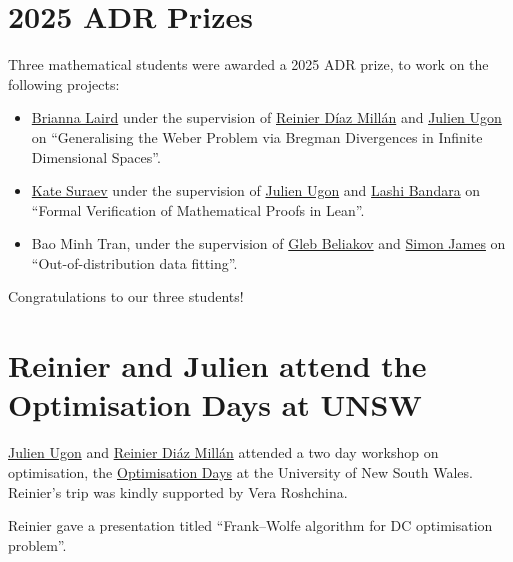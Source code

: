 \documentclass[10pt,twoside,a5paper]{scrreprt}
\begin{document}
  \section*{2025 ADR Prizes}

  Three mathematical students were awarded a 2025 ADR prize, to work on the following projects:

  \begin{itemize}
  
  \item
    \href{https://d-m-g.org/author/brianna-laird}{Brianna Laird} under the supervision
    of \href{https://d-m-g.org/author/reinier-diaz-millan}{Reinier Díaz Millán} and
    \href{https://d-m-g.org/author/julien-ugon}{Julien Ugon} on ``Generalising the
    Weber Problem via Bregman Divergences in Infinite Dimensional
    Spaces''.
  \item
    \href{https://d-m-g.org/author/kate-suraev}{Kate Suraev} under the supervision of
    \href{https://d-m-g.org/author/julien-ugon}{Julien Ugon} and
    \href{https://d-m-g.org/author/lashi-bandara}{Lashi Bandara} on ``Formal
    Verification of Mathematical Proofs in Lean''.
  \item
    Bao Minh Tran, under the supervision of
    \href{https://d-m-g.org/author/gleb-beliakov}{Gleb Beliakov} and
    \href{https://d-m-g.org/author/simon-james}{Simon James} on ``Out-of-distribution
    data fitting''.
  \end{itemize}

  Congratulations to our three students! 

  \section*{Reinier and Julien attend the Optimisation Days at UNSW}

  \href{https://d-m-g.org/author/julien-ugon}{Julien Ugon} and
  \href{https://d-m-g.org/author/reinier-diaz-millan}{Reinier Diáz Millán} attended a
  two day workshop on optimisation, the
  \href{https://www.unsw.edu.au/science/our-schools/maths/our-research/optimisation/opt_days}{Optimisation
  Days} at the University of New South Wales. Reinier's trip was kindly
  supported by Vera Roshchina.

  Reinier gave a presentation titled ``Frank--Wolfe algorithm for DC
  optimisation problem''.
\end{document}
